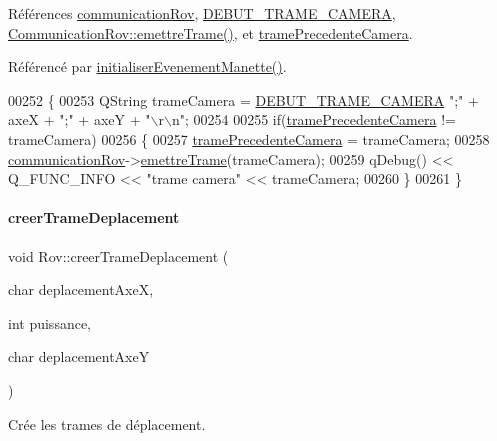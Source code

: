 Références \hyperlink{rov_8h_source_l00097}{communication\+Rov}, \hyperlink{rov_8h_source_l00070}{D\+E\+B\+U\+T\+\_\+\+T\+R\+A\+M\+E\+\_\+\+C\+A\+M\+E\+RA}, \hyperlink{communicationrov_8cpp_source_l00060}{Communication\+Rov\+::emettre\+Trame()}, et \hyperlink{rov_8h_source_l00107}{trame\+Precedente\+Camera}.



Référencé par \hyperlink{rov_8cpp_source_l00052}{initialiser\+Evenement\+Manette()}.


\begin{DoxyCode}
00252 \{
00253     QString trameCamera = \hyperlink{rov_8h_adc800d68618fc04d8386c438c5a890ca}{DEBUT\_TRAME\_CAMERA} \textcolor{stringliteral}{";"} + axeX + \textcolor{stringliteral}{";"} + axeY + \textcolor{stringliteral}{"\(\backslash\)r\(\backslash\)n"};
00254 
00255     \textcolor{keywordflow}{if}(\hyperlink{class_rov_a66e64595d9bb97dfbfa6f2ed9548b216}{tramePrecedenteCamera} != trameCamera)
00256     \{
00257         \hyperlink{class_rov_a66e64595d9bb97dfbfa6f2ed9548b216}{tramePrecedenteCamera} = trameCamera;
00258         \hyperlink{class_rov_a8e7aaa17ee2134f26d57241d11ab2a99}{communicationRov}->\hyperlink{class_communication_rov_a4f52076db8d6e78abe1745fa1e235272}{emettreTrame}(trameCamera);
00259         qDebug() << Q\_FUNC\_INFO << \textcolor{stringliteral}{"trame camera"} << trameCamera;
00260     \}
00261 \}
\end{DoxyCode}
\mbox{\label{class_rov_aa264d0723f6b491425ac2f85b933bab2}} 
\paragraph{\texorpdfstring{creer\+Trame\+Deplacement}{creerTrameDeplacement}}
{\footnotesize\ttfamily void Rov\+::creer\+Trame\+Deplacement (\begin{DoxyParamCaption}\item[{char}]{deplacement\+AxeX,  }\item[{int}]{puissance,  }\item[{char}]{deplacement\+AxeY }\end{DoxyParamCaption})\hspace{0.3cm}{\ttfamily [slot]}}



Crée les trames de déplacement. 



